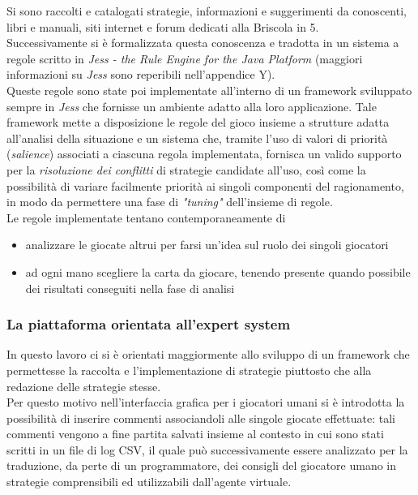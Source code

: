 \documentclass[runningheads,a4paper]{llncs}
\begin{document}
Si sono raccolti e catalogati strategie, informazioni e suggerimenti da conoscenti, libri e manuali, siti internet e forum dedicati alla Briscola in 5.\\
Successivamente si è formalizzata questa conoscenza e tradotta in un sistema a regole scritto in \emph{Jess -  the Rule Engine for the Java Platform} (maggiori informazioni su \emph{Jess} sono reperibili nell'appendice Y).\\
Queste regole sono state poi implementate all'interno di un framework sviluppato sempre in \emph{Jess} che fornisse un ambiente adatto alla loro applicazione.
Tale framework mette a disposizione le regole del gioco insieme a strutture adatta all'analisi della situazione e un sistema che, tramite l'uso di valori di priorità (\emph{salience}) associati a ciascuna regola implementata, fornisca un valido supporto per la \emph{risoluzione dei conflitti} di strategie candidate all'uso, così come la possibilità di variare facilmente priorità ai singoli componenti del ragionamento, in modo da permettere una fase di \emph{"tuning"} dell'insieme di regole.\\
Le regole implementate tentano contemporaneamente di 
\begin{itemize}
  \item analizzare le giocate altrui per farsi un'idea sul ruolo dei singoli giocatori
  \item ad ogni mano scegliere la carta da giocare, tenendo presente quando possibile dei risultati conseguiti nella fase di analisi 
\end{itemize}

\subsubsection{La piattaforma orientata all'expert system}
In questo lavoro ci si è orientati maggiormente allo sviluppo di un framework che permettesse la raccolta e l'implementazione di strategie piuttosto che alla redazione delle strategie stesse.\\
Per questo motivo nell'interfaccia grafica per i giocatori umani si è introdotta la possibilità di inserire commenti associandoli alle singole giocate effettuate: tali commenti vengono a fine partita salvati insieme al contesto in cui sono stati scritti in un file di log CSV, il quale può successivamente essere analizzato per la traduzione, da perte di un programmatore, dei consigli del giocatore umano in strategie comprensibili ed utilizzabili dall'agente virtuale.
\end{document}
